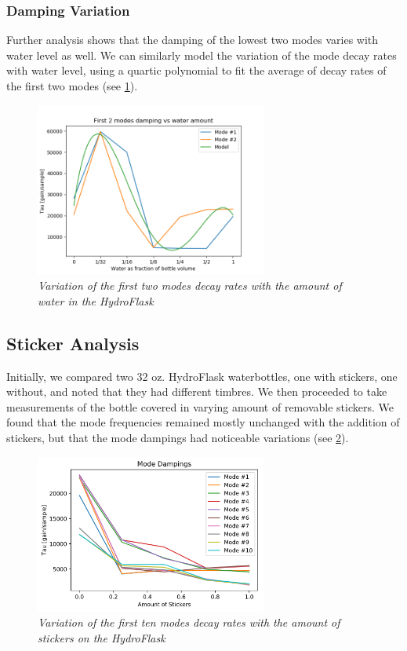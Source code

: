 \documentclass[twoside,a4paper]{article}
\begin{document}
\subsubsection{Damping Variation} \label{sec:water-damp}
%
Further analysis shows that the damping of the lowest two modes
varies with water level as well. We can similarly model the
variation of the mode decay rates with water level, using a
quartic polynomial to fit the average of decay rates of the first
two modes (see \cref{fig:water-mode-damp}).
%
\begin{figure}[!htb]
    \centering
    \includegraphics[width=3in]{../Figures/Water_Damping}
    \caption{\it{Variation of the first two modes decay rates
                 with the amount of water in the HydroFlask}}
    \label{fig:water-mode-damp}
\end{figure}
%
\subsection{Sticker Analysis} \label{sec:sticker}
%
Initially, we compared two 32 oz. HydroFlask waterbottles, one
with stickers, one without, and noted that they had different
timbres. We then proceeded to take measurements of the
bottle covered in varying amount of removable stickers. We found
that the mode frequencies remained mostly unchanged with the
addition of stickers, but that the mode dampings had noticeable
variations (see \cref{fig:sticker-mode-damp}).
%
\begin{figure}[!htb]
    \centering
    \includegraphics[width=3in]{../Figures/StickerDamping}
    \caption{\it{Variation of the first ten modes decay rates
                 with the amount of stickers on the HydroFlask}}
    \label{fig:sticker-mode-damp}
\end{figure}
%
\end{document}
